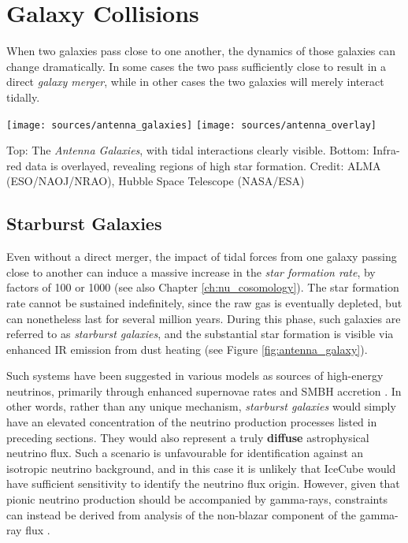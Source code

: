 \section{Galaxy Collisions}

When two galaxies pass close to one another, the dynamics of those galaxies can change dramatically. In some cases the two pass sufficiently close to result in a direct \emph{galaxy merger}, while in other cases the two galaxies will merely interact tidally.

\begin{marginfigure}
	\texttt{[image: sources/antenna\_galaxies]}
	\texttt{[image: sources/antenna\_overlay]}
	\caption{Top: The \emph{Antenna Galaxies}, with tidal interactions clearly visible. Bottom: Infra-red data is overlayed, revealing regions of high star formation. Credit: ALMA (ESO/NAOJ/NRAO), Hubble Space Telescope (NASA/ESA)}
	\label{fig:antenna_galaxy}
\end{marginfigure}

\subsection*{Starburst Galaxies}
Even without a direct merger, the impact of tidal forces from one galaxy passing close to another can induce a massive increase in the \emph{star formation rate}, by factors of 100 or 1000 (see also Chapter \ref{ch:nu_cosomology}). The star formation rate cannot be sustained indefinitely, since the raw gas is eventually depleted, but can nonetheless last for several million years. During this phase, such galaxies are referred to as \emph{starburst galaxies}, and the substantial star formation is visible via enhanced IR emission from dust heating (see Figure \ref{fig:antenna_galaxy}).

Such systems have been suggested in various models as sources of high-energy neutrinos, primarily through enhanced supernovae rates and SMBH accretion . In other words,  rather than any unique mechanism, \emph{starburst galaxies} would simply have an elevated concentration of the neutrino production processes listed in preceding sections. They would also represent a truly \textbf{diffuse} astrophysical neutrino flux. Such a scenario is unfavourable for identification against an isotropic neutrino background, and in this case it is unlikely that IceCube would have sufficient sensitivity to identify the neutrino flux origin. However, given that pionic neutrino production should be accompanied by gamma-rays, constraints can instead be derived from analysis of the non-blazar component of the gamma-ray flux .


